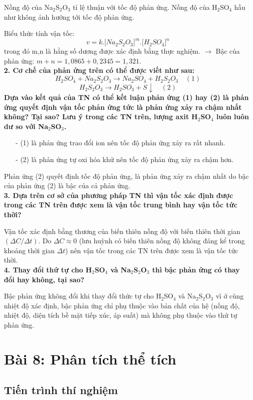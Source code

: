 \documentclass[12pt,a4paper]{report}
\begin{document}
Nồng độ của Na$_2$S$_2$O$_3$ tỉ lệ thuận với tốc độ phản ứng. Nồng độ của H$_2$SO$_4$ hầu như không ảnh hưởng tới tốc độ phản ứng. 

Biểu thức tính vận tốc: 
\[
    v = k.\lbrack Na_2S_2O_3 \rbrack^m . \lbrack H_2SO_4\rbrack^n
\]
trong đó m,n là hằng số dương được xác định bằng thực nghiệm. $\rightarrow$ Bậc của phản ứng: $m+n = 1,0865 +0,2345 = 1,321.$\\
\textbf{2. Cơ chế của phản ứng trên có thể được viết như sau:} 
\[
    H_2SO_4 + Na_2S_2O_3 \rightarrow Na_2SO_4 + H_2S_2O_3 \quad (1)
\]
\[
    H_2S_2O_3 \rightarrow H_2SO_3 + S \downarrow \quad (2)  
\]
\textbf{Dựa vào kết quả của TN có thể kết luận phản ứng (1) hay (2) là phản ứng quyết định vận tốc phản ứng tức là phản ứng xảy ra chậm nhất không? Tại sao? Lưu ý trong các TN trên, lượng axit H$_2$SO$_4$ luôn luôn dư so với Na$_2$SO$_3$.}
\begin{itemize}
    \item[-] (1) là phản ứng trao đổi ion nên tốc độ phản ứng xảy ra rất nhanh. 
    \item[-] (2) là phản ứng tự oxi hóa khử nên tốc độ phản ứng xảy ra chậm hơn. 
\end{itemize}
Phản ứng (2) quyết định tốc độ phản ứng, là phản ứng xảy ra chậm nhất do bậc của phản ứng (2) là bậc của cả phản ứng.\\
\textbf{3. Dựa trên cơ sở của phương pháp TN thì vận tốc xác định được trong các TN trên được xem là vận tốc trung bình hay vận tốc tức thời?}

Vận tốc xác định bằng thương của biến thiên nồng độ với biến thiên thời gian $(\Delta C/\Delta t)$. Do $\Delta C \approx 0$ (lưu huỳnh có biến thiên nồng độ không đáng kể trong khoảng thời gian $\Delta t$) nên vận tốc trong các TN trên được xem là vận tốc tức thời. \\
\textbf{4. Thay đổi thứ tự cho H$_2$SO$_4$ và Na$_2$S$_2$O$_3$ thì bậc phản ứng có thay đổi hay không, tại sao?} 

Bậc phản ứng không đổi khi thay đổi thức tự cho H$_2$SO$_4$ và Na$_2$S$_2$O$_3$ vì ở cùng nhiệt độ xác định, bậc phản ứng chỉ phụ thuộc vào bản chất của hệ (nồng độ, nhiệt độ, diện tích bề mặt tiếp xúc, áp suất) mà không phụ thuộc vào thứ tự phản ứng. 
\newpage
\section{Bài 8: Phân tích thể tích}
\subsection{Tiến trình thí nghiệm}
\end{document}
